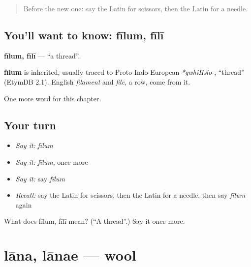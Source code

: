 \label{lesson:LA-C140-filum}



\begin{quote}
Before the new one: say the Latin for scissors, then the Latin for a needle.
\end{quote}

\subsection*{You'll want to know: fīlum, fīlī}
\textbf{fīlum, fīlī} — \textquotedblleft{}a thread\textquotedblright{}.

\begin{cousinweb}
\textbf{fīlum} is inherited, usually traced to Proto-Indo-European \emph{*gwhiHslo-}, \textquotedblleft{}thread\textquotedblright{} (EtymDB 2.1). English \emph{filament} and \emph{file}, a row, come from it.
\end{cousinweb}

\begin{grammarlens}[title={What you've built}]
One more word for this chapter.
\end{grammarlens}

\subsection*{Your turn}
\begin{itemize}
\raggedright
  \item \emph{Say it:} \emph{fīlum}
  \item \emph{Say it:} \emph{fīlum}, once more
  \item \emph{Say it:} say \emph{fīlum}
  \item \emph{Recall:} say the Latin for scissors, then the Latin for a needle, then say \emph{fīlum} again
\end{itemize}

\begin{tcolorbox}[breakable,colback=teal!4,colframe=teal!35!black,title={Before you move on}]
What does fīlum, fīlī mean? (\textquotedblleft{}A thread\textquotedblright{}.) Say it once more.
\end{tcolorbox}
\section[lāna, lānae]{lāna, lānae — wool}

\label{lesson:LA-C140-lana}



